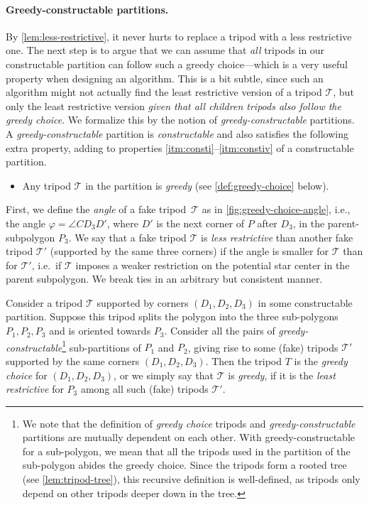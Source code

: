 \documentclass{theoretics}
\begin{document}
\paragraph{Greedy-constructable partitions.}
By \cref{lem:less-restrictive}, it never hurts to replace a tripod with a less restrictive one. The next step is to argue that we can assume that \emph{all} tripods in our constructable partition can follow such a greedy choice---which is a very useful property when designing an algorithm. This is a bit subtle, since such an algorithm might not actually find the least restrictive version of a tripod $\mathcal{T}$, but only the least restrictive version \emph{given that all children tripods also follow the greedy choice}. We formalize this by the notion of \emph{greedy-constructable} partitions.
A \emph{greedy-constructable} partition is \emph{constructable} and also satisfies the following extra property, adding to properties \ref{itm:consti}--\ref{itm:constiv} of a constructable partition.
\begin{itemize}
\item[(v)] Any tripod $\mathcal{T}$ in the partition is \emph{greedy} (see \cref{def:greedy-choice} below).
\end{itemize}

\begin{definition}
\label{def:greedy-choice}
First, we define the \emph{angle} of a fake tripod~$\mathcal{T}$ as in \cref{fig:greedy-choice-angle}, i.e., the angle $\varphi = \angle CD_3D'$, where $D'$ is the next corner of $P$ after $D_3$, in the parent-subpolygon $P_3$.
We say that a fake tripod $\mathcal{T}$ is \emph{less restrictive} than another fake tripod $\mathcal{T}'$ (supported by the same three corners) if the angle is smaller for $\mathcal{T}$ than for $\mathcal{T}'$, i.e.\ if $\mathcal{T}$ imposes a weaker restriction on the potential star center in the parent subpolygon.
We break ties in an arbitrary but consistent manner.

Consider a tripod $\mathcal{T}$ supported by corners $(D_1, D_2, D_3)$ in some constructable partition. Suppose this tripod splits the polygon into the three sub-polygons $P_1, P_2, P_3$ and is oriented towards $P_3$. Consider all the pairs of \emph{greedy-constructable}\footnote{We note that the definition of \emph{greedy choice} tripods and \emph{greedy-constructable} partitions are mutually dependent on each other. With greedy-constructable for a sub-polygon, we mean that all the tripods used in the partition of the sub-polygon abides the greedy choice. Since the tripods form a rooted tree (see \cref{lem:tripod-tree}), this recursive definition is well-defined, as tripods only depend on other tripods deeper down in the tree.} sub-partitions of $P_1$ and $P_2$, giving rise to some (fake) tripods $\mathcal{T}'$ supported by the same corners $(D_1, D_2, D_3)$. Then the tripod $T$ is the \emph{greedy choice} for $(D_1,D_2,D_3)$, or we simply say that $\mathcal{T}$ is \emph{greedy}, if it is the \emph{least restrictive} for $P_3$ among all such (fake) tripods $\mathcal{T}'$.
\end{definition}
 
\end{document}
